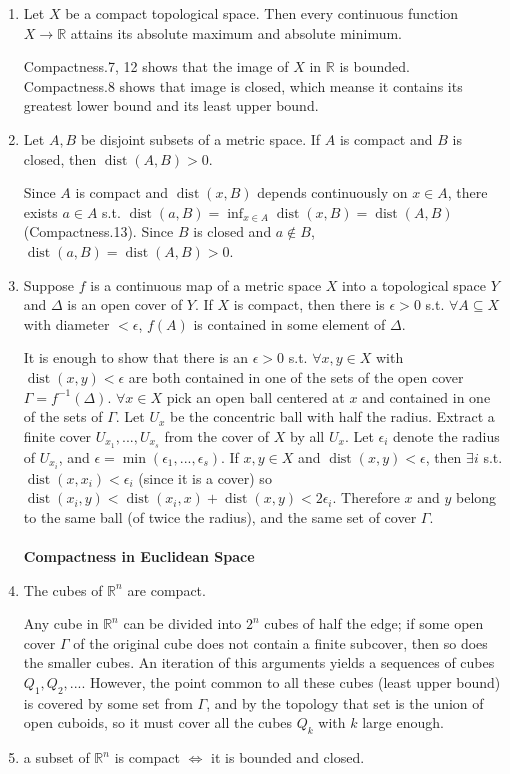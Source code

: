 \documentclass{article}
\DeclareMathOperator{\dist}{dist}
\begin{document}
\begin{enumerate}
From \color{gray}Compactness.10\color{black}, the diameter is at most \(\epsilon\) times the number of balls in the finite cover.
\item Let \(X\) be a compact topological space. Then every continuous function \(X\to \mathbb{R}\) attains its absolute maximum and absolute minimum.

\color{gray}Compactness.7, 12 \color{black}shows that the image of \(X\) in \(\mathbb{R}\) is bounded. \color{gray}Compactness.8 \color{black} shows that image is closed, which meanse it contains its greatest lower bound and its least upper bound.
\item Let \(A,B\) be disjoint subsets of a metric space. If \(A\) is compact and \(B\) is closed, then \(\dist(A,B)>0\).

Since \(A\) is compact and \(\dist(x,B)\) depends continuously on \(x\in A\), there exists \(a\in A\) s.t. \(\dist(a,B)=\inf_{x\in A}\dist(x,B)=\dist(A,B)\) \color{gray}(Compactness.13)\color{black}.
Since \(B\) is closed and \(a\notin B\), \(\dist(a,B)=\dist(A,B)>0\).
\item Suppose \(f\) is a continuous map of a metric space \(X\) into a topological space \(Y\) and \(\Delta\) is an open cover of \(Y\). If \(X\) is compact, then there is \(\epsilon>0\) s.t. \(\forall A\subseteq X\) with diameter \(<\epsilon\), \(f(A)\) is contained in some element of \(\Delta\).

It is enough to show that there is an \(\epsilon>0\) s.t. \(\forall x,y\in X\) with \(\dist(x,y)<\epsilon\) are both contained in one of the sets of the open cover \(\Gamma=f^{-1}(\Delta)\).
\(\forall x\in X\) pick an open ball centered at \(x\) and contained in one of the sets of \(\Gamma\). Let \(U_{x}\) be the concentric ball with half the radius. Extract a finite cover \(U_{x_{1}},...,U_{x_{s}}\) from the cover of \(X\) by all \(U_{x}\).
Let \(\epsilon_{i}\) denote the radius of \(U_{x_{i}}\), and \(\epsilon = \min(\epsilon_{1},...,\epsilon_{s})\). If \(x,y\in X\) and \(\dist(x,y)<\epsilon\), then \(\exists i\) s.t. \(\dist(x,x_{i})<\epsilon_{i}\) (since it is a cover) so \(\dist(x_{i},y)<\dist(x_{i},x)+\dist(x,y)<2\epsilon_{i}\).
Therefore \(x\) and \(y\) belong to the same ball (of twice the radius), and the same set of cover \(\Gamma\).
\\\\
\textbf{Compactness in Euclidean Space}
\item The cubes of \(\mathbb{R}^{n}\) are compact.

Any cube in \(\mathbb{R}^{n}\) can be divided into \(2^{n}\) cubes of half the edge; if some open cover \(\Gamma\) of the original cube does not contain a finite subcover, then so does the smaller cubes. An iteration of this arguments yields a sequences of cubes \(Q_{1},Q_{2},...\).
However, the point common to all these cubes (least upper bound) is covered by some set from \(\Gamma\), and by the topology that set is the union of open cuboids, so it must cover all the cubes \(Q_{k}\) with \(k\) large enough.
\item a subset of \(\mathbb{R}^{n}\) is compact \(\Longleftrightarrow\) it is bounded and closed.


\end{enumerate}
\end{document}
